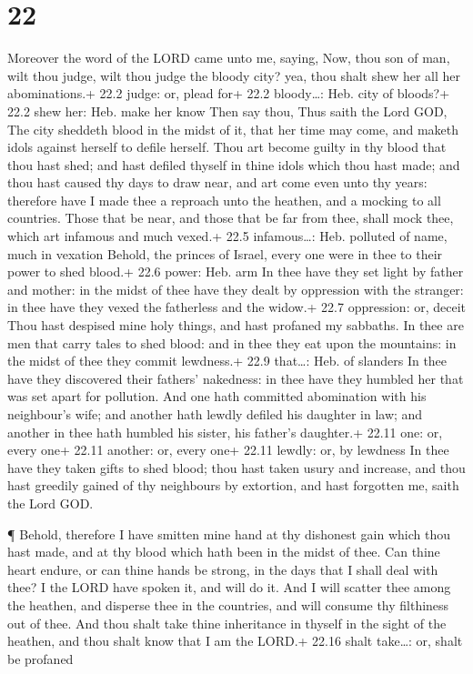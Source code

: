 \hypertarget{section-21}{%
\section{22}\label{section-21}}

 Moreover the word of the LORD came unto me, saying,
 Now, thou son of man, wilt thou judge, wilt thou judge the
bloody city? yea, thou shalt shew her all her abominations.+ 22.2 judge:
or, plead for+ 22.2 bloody\ldots: Heb. city of bloods?+ 22.2 shew her:
Heb. make her know  Then say thou, Thus saith the Lord GOD,
The city sheddeth blood in the midst of it, that her time may come, and
maketh idols against herself to defile herself.  Thou art
become guilty in thy blood that thou hast shed; and hast defiled thyself
in thine idols which thou hast made; and thou hast caused thy days to
draw near, and art come even unto thy years: therefore have I made thee
a reproach unto the heathen, and a mocking to all countries.
 Those that be near, and those that be far from thee, shall
mock thee, which art infamous and much vexed.+ 22.5 infamous\ldots: Heb.
polluted of name, much in vexation  Behold, the princes of
Israel, every one were in thee to their power to shed blood.+ 22.6
power: Heb. arm  In thee have they set light by father and
mother: in the midst of thee have they dealt by oppression with the
stranger: in thee have they vexed the fatherless and the widow.+ 22.7
oppression: or, deceit  Thou hast despised mine holy things,
and hast profaned my sabbaths.  In thee are men that carry
tales to shed blood: and in thee they eat upon the mountains: in the
midst of thee they commit lewdness.+ 22.9 that\ldots: Heb. of slanders
 In thee have they discovered their fathers' nakedness: in
thee have they humbled her that was set apart for pollution.
 And one hath committed abomination with his neighbour's
wife; and another hath lewdly defiled his daughter in law; and another
in thee hath humbled his sister, his father's daughter.+ 22.11 one: or,
every one+ 22.11 another: or, every one+ 22.11 lewdly: or, by lewdness
 In thee have they taken gifts to shed blood; thou hast
taken usury and increase, and thou hast greedily gained of thy
neighbours by extortion, and hast forgotten me, saith the Lord GOD.

 ¶ Behold, therefore I have smitten mine hand at thy
dishonest gain which thou hast made, and at thy blood which hath been in
the midst of thee.  Can thine heart endure, or can thine
hands be strong, in the days that I shall deal with thee? I the LORD
have spoken it, and will do it.  And I will scatter thee
among the heathen, and disperse thee in the countries, and will consume
thy filthiness out of thee.  And thou shalt take thine
inheritance in thyself in the sight of the heathen, and thou shalt know
that I am the LORD.+ 22.16 shalt take\ldots: or, shalt be profaned

